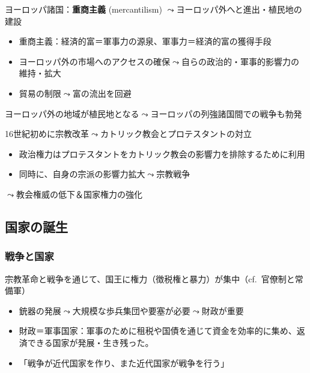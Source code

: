 \documentclass[
  xelatex,
  ja=standard]{bxjsarticle}
\providecommand{\tightlist}{%
  \setlength{\itemsep}{0pt}\setlength{\parskip}{0pt}}\usepackage{longtable,booktabs,array}
\begin{document}
ヨーロッパ諸国：\textbf{重商主義} (mercantilism)
\(\leadsto\)ヨーロッパ外へと進出・植民地の建設

\begin{itemize}
\tightlist
\item
  重商主義：経済的富＝軍事力の源泉、軍事力＝経済的富の獲得手段
\item
  ヨーロッパ外の市場へのアクセスの確保\(\leadsto\)自らの政治的・軍事的影響力の維持・拡大
\item
  貿易の制限\(\leadsto\)富の流出を回避
\end{itemize}

ヨーロッパ外の地域が植民地となる\(\leadsto\)ヨーロッパの列強諸国間での戦争も勃発

16世紀初めに宗教改革\(\leadsto\)カトリック教会とプロテスタントの対立

\begin{itemize}
\tightlist
\item
  政治権力はプロテスタントをカトリック教会の影響力を排除するために利用
\item
  同時に、自身の宗派の影響力拡大\(\leadsto\)宗教戦争
\end{itemize}

\(\leadsto\)教会権威の低下＆国家権力の強化

\hypertarget{ux56fdux5bb6ux306eux8a95ux751f}{%
\subsection{国家の誕生}\label{ux56fdux5bb6ux306eux8a95ux751f}}

\hypertarget{ux6226ux4e89ux3068ux56fdux5bb6}{%
\subsubsection{戦争と国家}\label{ux6226ux4e89ux3068ux56fdux5bb6}}

宗教革命と戦争を通じて、国王に権力（徴税権と暴力）が集中（cf.~官僚制と常備軍）

\begin{itemize}
\tightlist
\item
  銃器の発展\(\leadsto\)大規模な歩兵集団や要塞が必要\(\leadsto\)財政が重要
\item
  財政＝軍事国家：軍事のために租税や国債を通じて資金を効率的に集め、返済できる国家が発展・生き残った\citep{brewer2003}。
\item
  「戦争が近代国家を作り、また近代国家が戦争を行う」\citep{tilly1992}
\end{itemize}
\end{document}
